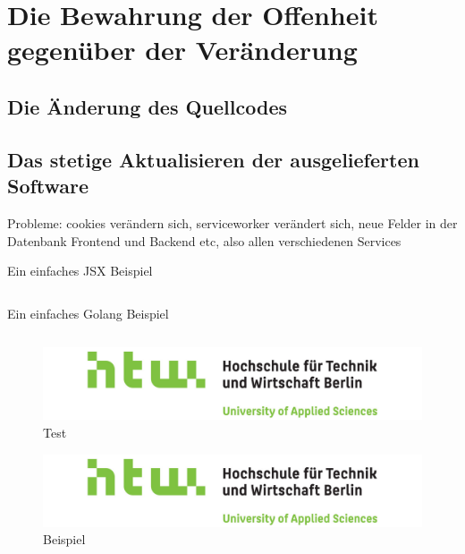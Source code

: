 \section{Die Bewahrung der Offenheit gegenüber der Veränderung}
\label{sec:die-bewahrung-der-offenheit-gegenueber-der-veraenderung}

\subsection{Die Änderung des Quellcodes}

\subsection{Das stetige Aktualisieren der ausgelieferten Software}
Probleme: cookies verändern sich, serviceworker verändert sich, neue Felder in der Datenbank
Frontend und Backend etc, also allen verschiedenen Services


\begin{listing}
    \label{lst:HelloJSX}
    \caption{Ein einfaches JSX Beispiel}
    \inputminted{jsx}{snippets/examples/Welcome.jsx}
\end{listing}

\begin{listing}
    \label{lst:Golang}
    \caption{Ein einfaches Golang Beispiel}
    \inputminted{go}{snippets/examples/hello.go}
\end{listing}

\newpage

\begin{figure}
    \label{figure:test}
    \includegraphics[scale=0.2]{img/HTW}
    \caption{Test}
\end{figure}

\begin{figure}
    \label{figure:beispiel}
    \includegraphics[scale=0.2]{img/HTW}
    \caption{Beispiel}
\end{figure}

